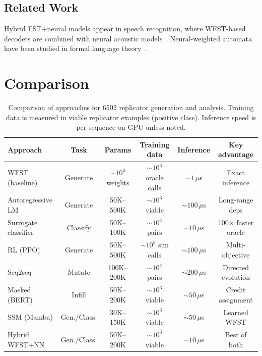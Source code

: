 \documentclass{article}
\begin{document}
\subsection{Related Work}

Hybrid FST+neural models appear in speech recognition, where
WFST-based decoders are combined with neural acoustic
models~\cite{mohri2002weighted}.  Neural-weighted automata have
been studied in formal language theory~\cite{schwartz2018sopa}.


\section{Comparison}
\label{sec:comparison}

\begin{table}[htbp]
\centering
\caption{Comparison of approaches for 6502 replicator generation and analysis.
Training data is measured in viable replicator examples (positive class).
Inference speed is per-sequence on GPU unless noted.}
\label{tab:comparison}
\small
\renewcommand{\arraystretch}{1.2}
\begin{tabular}{@{}l c c c c c@{}}
\toprule
\textbf{Approach} &
\textbf{Task} &
\textbf{Params} &
\textbf{Training data} &
\textbf{Inference} &
\textbf{Key advantage} \\
\midrule
WFST (baseline) &
Generate &
${\sim}10^3$ weights &
${\sim}10^3$ oracle calls &
${\sim}1\,\mu$s &
Exact inference \\
\midrule
Autoregressive LM &
Generate &
50K--500K &
${\sim}10^3$ viable &
${\sim}100\,\mu$s &
Long-range deps \\
Surrogate classifier &
Classify &
50K--100K &
${\sim}10^4$ pairs &
${\sim}10\,\mu$s &
100$\times$ faster oracle \\
RL (PPO) &
Generate &
50K--500K &
${\sim}10^5$ sim calls &
${\sim}100\,\mu$s &
Multi-objective \\
Seq2seq &
Mutate &
100K--200K &
${\sim}10^4$ pairs &
${\sim}200\,\mu$s &
Directed evolution \\
Masked (BERT) &
Infill &
50K--200K &
${\sim}10^3$ viable &
${\sim}50\,\mu$s &
Credit assignment \\
SSM (Mamba) &
Gen./Class. &
30K--150K &
${\sim}10^3$ viable &
${\sim}50\,\mu$s &
Learned WFST \\
Hybrid WFST+NN &
Gen./Class. &
50K--200K &
${\sim}10^3$ viable &
${\sim}10\,\mu$s &
Best of both \\
\bottomrule
\end{tabular}
\end{table}
\end{document}
